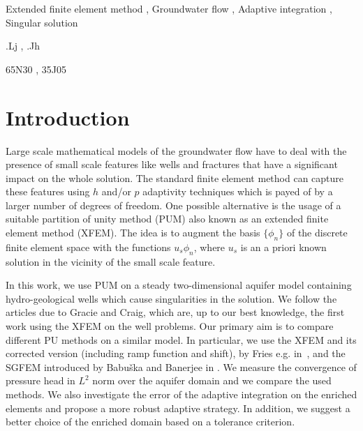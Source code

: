 \documentclass{elsarticle}
\begin{document}
\begin{frontmatter}
\begin{abstract}
\end{abstract}

\begin{keyword}
Extended finite element method \sep 
Groundwater flow \sep
Adaptive integration \sep 
Singular solution 

.Lj \sep        %
.Jh             %

\MSC[2010] 65N30 \sep %
\MSC[2010] 35J05  %

\end{keyword}

\end{frontmatter}


\section{Introduction}
\label{sec:introduction}

Large scale mathematical models of the groundwater flow have to deal with the presence of small scale features like wells 
and fractures that have a significant impact on the whole solution. The standard finite element method can 
capture these features using $h$ and/or $p$ adaptivity techniques 
which is payed of by a larger number of degrees of freedom. One possible alternative is the usage of 
a suitable partition of unity method (PUM) also known as an extended finite element method (XFEM). The idea is to 
augment the basis $\{\phi_n\}$ of the discrete finite element space with the functions $u_s \phi_n$, where $u_s$ is 
an a priori known solution in the vicinity of the small scale feature. 

In this work, we use PUM on a steady two-dimensional aquifer model containing hydro-geological wells which
cause singularities in the solution. We follow the articles \cite{gracie_modelling_2010, craig_using_2011} due to Gracie and Craig,
which are, up to our best knowledge, the first work using the XFEM on the well problems.
Our primary aim is to compare different PU methods on a similar model. In particular, we use the XFEM 
and its corrected version (including ramp function and shift), by Fries e.g. in~\cite{fries_corrected_2008}, 
and the SGFEM introduced by Babu{\v s}ka and Banerjee in \cite{babuska_stable_2012, gupta_stable_2013}. We measure 
the convergence of pressure head in $L^2$ norm over the aquifer domain and we compare the used methods. 
We also investigate the error of the adaptive integration on the enriched elements and propose a more robust adaptive strategy.
In addition, we suggest a better choice of the enriched domain based on a tolerance criterion.
\end{document}
